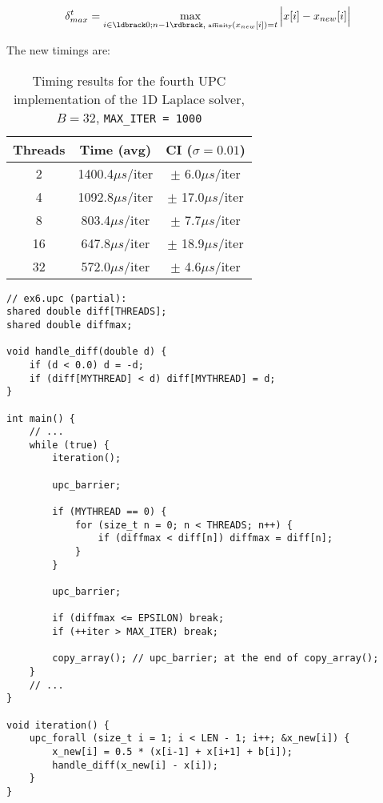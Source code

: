 \documentclass[12pt]{article}
\newcommand{\us}[0]{${\mu}s$}
\begin{document}
$$\delta_{max}^t = \max_{i\in \ldbrack 0; n-1 \rdbrack, \; \textrm{\tiny affinity}(x_{new}[i]) = t}{\Bigl\vert x[i]-x_{new}[i] \Bigr\vert}$$

The new timings are:

\begin{table}[ht]
  \centering\begin{tabular}{|c|c|c|}
    \hline
    Threads & Time (avg) & CI ($\sigma=0.01$) \\
    \hline
    2 & 1400.4\us/iter & $\pm$ 6.0\us/iter \\
    4 & 1092.8\us/iter & $\pm$ 17.0\us/iter \\
    8 & 803.4\us/iter & $\pm$ 7.7\us/iter \\
    16 & 647.8\us/iter & $\pm$ 18.9\us/iter \\
    32 & 572.0\us/iter & $\pm$ 4.6\us/iter \\
    \hline
  \end{tabular}
  \caption{Timing results for the fourth UPC implementation of the 1D Laplace solver, $B = 32$, \texttt{MAX\_ITER = 1000}}
  \label{tab:laplace6}
\end{table}

\begin{lstlisting}[style=C, caption={Excerpt from ex6.upc: new \texttt{handle\_diff} function and calculation of \texttt{diffmax}}, label={lst:laplace6}]
// ex6.upc (partial):
shared double diff[THREADS];
shared double diffmax;

void handle_diff(double d) {
    if (d < 0.0) d = -d;
    if (diff[MYTHREAD] < d) diff[MYTHREAD] = d;
}

int main() {
    // ...
    while (true) {
        iteration();

        upc_barrier;

        if (MYTHREAD == 0) {
            for (size_t n = 0; n < THREADS; n++) {
                if (diffmax < diff[n]) diffmax = diff[n];
            }
        }

        upc_barrier;

        if (diffmax <= EPSILON) break;
        if (++iter > MAX_ITER) break;

        copy_array(); // upc_barrier; at the end of copy_array();
    }
    // ...
}

void iteration() {
    upc_forall (size_t i = 1; i < LEN - 1; i++; &x_new[i]) {
        x_new[i] = 0.5 * (x[i-1] + x[i+1] + b[i]);
        handle_diff(x_new[i] - x[i]);
    }
}
\end{lstlisting}
\end{document}
